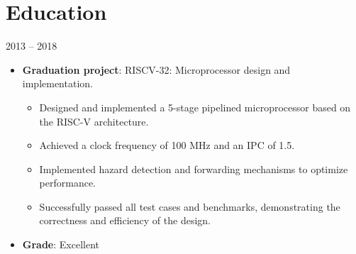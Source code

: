 \section{Education}

\begin{minipage}{\textwidth}
%
         {2013 -- 2018}{}

\begin{itemize}
  \item \textbf{Graduation project}: RISCV-32: Microprocessor design and implementation.
  \begin{itemize}
    \item Designed and implemented a 5-stage pipelined microprocessor based on the RISC-V architecture.
    \item Achieved a clock frequency of 100 MHz and an IPC of 1.5.
    \item Implemented hazard detection and forwarding mechanisms to optimize performance.
    \item Successfully passed all test cases and benchmarks, demonstrating the correctness and efficiency of the design.
  \end{itemize}
  \item \textbf{Grade}: Excellent
\end{itemize}
\end{minipage}
